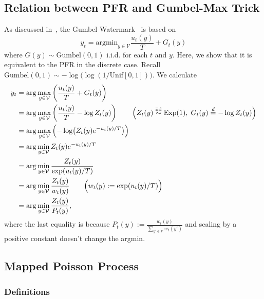 \documentclass{article}
\theoremstyle{plain}
\theoremstyle{definition}
\begin{document}
\subsection{Relation between PFR and Gumbel-Max Trick}
\label{subsapp::PFR_gumbel}


As discussed in~\citep{zhao2024permute}, the Gumbel Watermark~\citep{aaronson2023watermarking} is based on  
\begin{equation*}
    y_t = \mathrm{argmin}_{y\in\mathcal{V}} \frac{u_t(y)}{T} + G_t(y)
\end{equation*}
where $G(y)\sim \mathrm{Gumbel}(0,1)$ i.i.d. for each $t$ and $y$. 
Here, we show that it is equivalent to the PFR in the discrete case. 
Recall $\mathrm{Gumbel}(0,1) \sim -\log\big(\log(1/\mathrm{Unif}[0,1]) \big)$. 
We calculate
\begin{align*}
y_t
&= \arg\max_{y\in\mathcal{V}}\left(\frac{u_t(y)}{T} + G_t(y)\right)\\
&= \arg\max_{y\in\mathcal{V}}\left(\frac{u_t(y)}{T} - \log Z_t(y)\right)
\qquad\Bigl(Z_t(y) \stackrel{\mathrm{iid}}{\sim} \mathrm{Exp}(1),\; G_t(y)\stackrel{d}{=}-\log Z_t(y)\Bigr)\\
&= \arg\max_{y\in\mathcal{V}}\left(-\log \bigl(Z_t(y)e^{-u_t(y)/T}\bigr)\right)\\
&= \arg\min_{y\in\mathcal{V}} Z_t(y)e^{-u_t(y)/T}\\
&= \arg\min_{y\in\mathcal{V}} \frac{Z_t(y)}{\exp(u_t(y)/T)}\\
&= \arg\min_{y\in\mathcal{V}} \frac{Z_t(y)}{w_t(y)}
\qquad\Bigl(w_t(y):=\exp(u_t(y)/T)\Bigr)\\
&= \arg\min_{y\in\mathcal{V}} \frac{Z_t(y)}{P_t(y)},
\end{align*} 
where the last equality is because $P_t(y):=\tfrac{w_t(y)}{\sum_{y'\in\mathcal{V}} w_t(y')}$ and scaling by a positive constant doesn't change the argmin. 



\subsection{Mapped Poisson Process}
\label{subapp::mapped_PP}

\subsubsection{Definitions}
\end{document}
